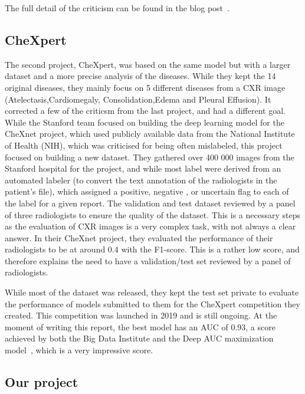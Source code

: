\documentclass[11pt]{article}
\begin{document}
        The full detail of the criticism can be found in the blog post~\cite{chexnet_critic}.

    \subsection{CheXpert}


        The second project, CheXpert, was based on the same model but with a larger dataset and a more precise analysis
        of the diseases. While they kept the 14 original diseases, they mainly focus on 5 different diseases from a CXR image
        (Atelectasis,Cardiomegaly, Consolidation,Edema and Pleural Effusion). It corrected a few of the criticsm
        from the last project, and had a different goal. While the Stanford team focused on building the deep learning model
        for the CheXnet project, which used publicly available data from the National Institute of Health (NIH),
        which was criticised for being often mislabeled, this project focused on building a new dataset. They gathered
        over 400 000 images from the Stanford hospital for the project, and while most label were derived from an
        automated labeler (to convert the text annotation of the radiologists in the patient's file), which assigned
        a positive, negative , or uncertain flag to each of the label for a given report. The validation
        and test dataset reviewed by a panel of three radiologists to ensure the quality of the dataset.
        This is a necessary steps as the evaluation of CXR images is a very
        complex task, with not always a clear answer. In their CheXnet project, they evaluated the performance of
        their radiologists to be at around 0.4 with the F1-score. This is a rather low score, and therefore explains
        the need to have a validation/test set reviewed by a panel of radiologists.

        While most of the dataset was released, they kept the test set private to evaluate the performance of models
        submitted to them for the CheXpert competition they created. This competition was launched in 2019 and is still
        ongoing. At the moment of writing this report, the best model has an AUC of 0.93, a score achieved by both
        the Big Data Institute\cite{hierarchical} and the Deep AUC maximization model~\cite{DeepAUC}, which is a
        very impressive score.


    \subsection{Our project}
\end{document}
